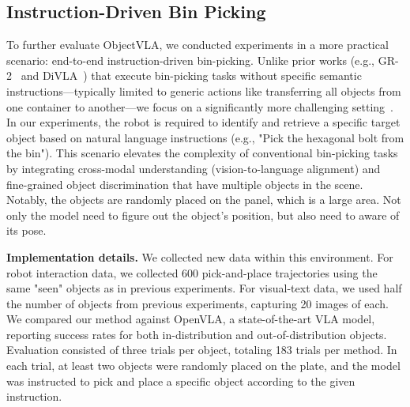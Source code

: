\subsection{Instruction-Driven Bin Picking}
\label{sec:bin-picking}
\begin{table}[t]
\centering
\vspace{0.1cm}
\caption{\textbf{Experimental results for bin picking.} Our proposed ObjectVLA achieves high performance on both 11 in-distribution objects and 50 out-of-distribution objects, with each object evaluated across 3 trials. We report the number of successful trials over total trials.}
\label{tab:bin-picking}
\vspace{-0.5cm}
\end{table}
To further evaluate ObjectVLA, we conducted experiments in a more practical scenario: end-to-end instruction-driven bin-picking. Unlike prior works (e.g., GR-2~\cite{cheang2024gr2} and DiVLA~\cite{wen2024diffusionvla}) that execute bin-picking tasks without specific semantic instructions—typically limited to generic actions like transferring all objects from one container to another—we focus on a significantly more challenging setting~\cite{cheang2024gr2,wen2024diffusionvla}. In our experiments, the robot is required to identify and retrieve a specific target object based on natural language instructions (e.g., "Pick the hexagonal bolt from the bin"). This scenario elevates the complexity of conventional bin-picking tasks by integrating cross-modal understanding (vision-to-language alignment) and fine-grained object discrimination that have multiple objects in the scene. Notably, the objects are randomly placed on the panel, which is a large area. Not only the model need to figure out the object's position, but also need to aware of its pose. 

\noindent
\textbf{Implementation details.} We collected new data within this environment.  For robot interaction data, we collected 600 pick-and-place trajectories using the same "seen" objects as in previous experiments.  For visual-text data, we used half the number of objects from previous experiments, capturing 20 images of each. We compared our method against OpenVLA, a state-of-the-art VLA model, reporting success rates for both in-distribution and out-of-distribution objects. Evaluation consisted of three trials per object, totaling 183 trials per method. In each trial, at least two objects were randomly placed on the plate, and the model was instructed to pick and place a specific object according to the given instruction.

